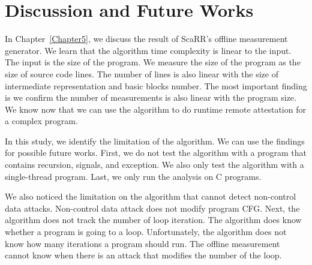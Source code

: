 
\chapter{Discussion and Future Works} %

\label{Chapter6} %

In Chapter~\ref{Chapter5}, we discuss the result of ScaRR's offline measurement
generator. We learn that the algorithm time complexity is linear to the input.
The input is the size of the program. We measure the size of the program as the
size of source code lines. The number of lines is also linear with the size of
intermediate representation and basic blocks number. The most important finding
is we confirm the number of measurements is also linear with the program size.
We know now that we can use the algorithm to do runtime remote attestation for a
complex program.

In this study, we identify the limitation of the algorithm. We can use the
findings for possible future works. First, we do not test the algorithm with a
program that contains recursion, signals, and exception. We also only test the
algorithm with a single-thread program. Last, we only run the analysis on C
programs.

We also noticed the limitation on the algorithm that cannot detect non-control
data attacks. Non-control data attack does not modify program CFG. Next, the
algorithm does not track the number of loop iteration. The algorithm does know
whether a program is going to a loop. Unfortunately, the algorithm does not know
how many iterations a program should run. The offline measurement cannot know
when there is an attack that modifies the number of the loop. 